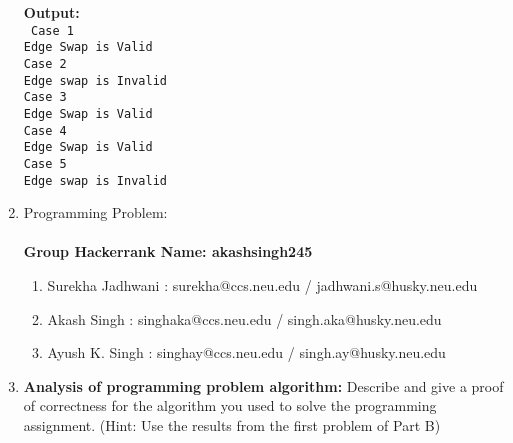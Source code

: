 \documentclass[12pt]{article}
\begin{document}
\begin{enumerate}


\textbf{Output:}\\
\texttt{
Case 1\\
Edge Swap is Valid\\
Case 2\\
Edge swap is Invalid\\
Case 3\\
Edge Swap is Valid\\
Case 4\\
Edge Swap is Valid\\
Case 5\\
Edge swap is Invalid\\
}

\pagebreak
\item Programming Problem:\\
\\
\textbf{\large{Group Hackerrank Name: akashsingh245 }}
\begin{enumerate}
	\item Surekha Jadhwani : surekha@ccs.neu.edu / jadhwani.s@husky.neu.edu
	\item Akash Singh : singhaka@ccs.neu.edu / singh.aka@husky.neu.edu
	\item Ayush K. Singh : singhay@ccs.neu.edu / singh.ay@husky.neu.edu
\end{enumerate}

\pagebreak
\item \textbf{Analysis of programming problem algorithm:} Describe and give a proof of correctness for the algorithm you used to solve the programming assignment. (Hint: Use the results from the first problem of Part B)


\end{enumerate}
\end{document}

